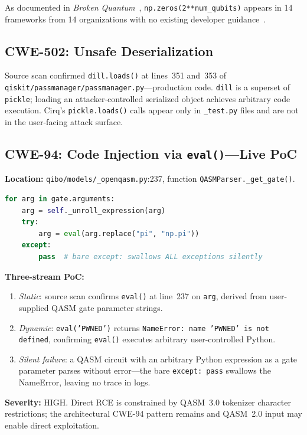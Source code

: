 \documentclass[conference,compsoc]{IEEEtran}
\newcommand{\broken}{\textit{Broken Quantum}~\cite{blain2026broken}}
\begin{document}
\noindent
As documented in \broken, \texttt{np.zeros(2**num\_qubits)} appears
in 14 frameworks from 14 organizations with no existing developer
guidance~\cite{blain2026broken}.

\subsection{CWE-502: Unsafe Deserialization}
\noindent Source scan confirmed \texttt{dill.loads()} at lines~351 and~353 of
\texttt{qiskit/passmanager/passmanager.py}---production code.
\texttt{dill} is a superset of \texttt{pickle}; loading an
attacker-controlled serialized object achieves arbitrary code
execution.
Cirq's \texttt{pickle.loads()} calls appear only in
\texttt{\_test.py} files and are not in the user-facing attack surface.

\subsection{CWE-94: Code Injection via \texttt{eval()}---Live PoC}
\noindent \textbf{Location:}
\texttt{qibo/models/\_openqasm.py}:237,
function \texttt{QASMParser.\_get\_gate()}.

\begin{lstlisting}[language=Python,
  caption={CWE-94 in qibo: eval() on user-controlled QASM gate parameter.}]
for arg in gate.arguments:
    arg = self._unroll_expression(arg)
    try:
        arg = eval(arg.replace("pi", "np.pi"))
    except:
        pass  # bare except: swallows ALL exceptions silently
\end{lstlisting}

\noindent \textbf{Three-stream PoC:}
\begin{enumerate}[leftmargin=*,topsep=2pt,itemsep=1pt]
  \item \textit{Static}: source scan confirms \texttt{eval()} at
    line~237 on \texttt{arg}, derived from user-supplied QASM gate
    parameter strings.
  \item \textit{Dynamic}: \texttt{eval('PWNED')} returns
    \texttt{NameError: name 'PWNED' is not defined}, confirming
    \texttt{eval()} executes arbitrary user-controlled Python.
  \item \textit{Silent failure}: a QASM circuit with an arbitrary
    Python expression as a gate parameter parses without error---the
    bare \texttt{except:~pass} swallows the NameError, leaving no
    trace in logs.
\end{enumerate}

\noindent \textbf{Severity:} HIGH. Direct RCE is constrained by QASM~3.0
tokenizer character restrictions; the architectural CWE-94 pattern
remains and QASM~2.0 input may enable direct exploitation.
\end{document}

